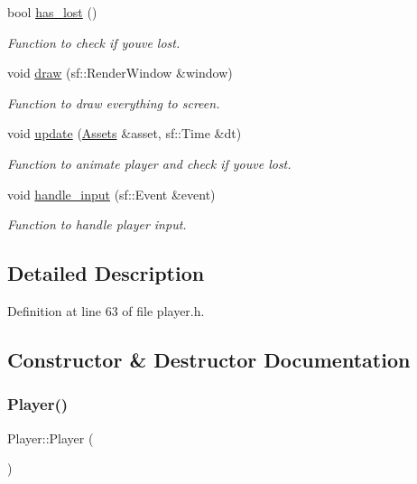 \begin{DoxyCompactItemize}
bool \hyperlink{class_player_a734ead9fd1aa89c2574310425da18dc7}{has\+\_\+lost} ()
\begin{DoxyCompactList}\small\item\em Function to check if you\textquotesingle{}ve lost. \end{DoxyCompactList}\item 
void \hyperlink{class_player_a70bbe0afb8ef88207288c9134ae80b6e}{draw} (sf\+::\+Render\+Window \&window)
\begin{DoxyCompactList}\small\item\em Function to draw everything to screen. \end{DoxyCompactList}\item 
void \hyperlink{class_player_a83282cabf0d698e16fe452759c50712c}{update} (\hyperlink{class_assets}{Assets} \&asset, sf\+::\+Time \&dt)
\begin{DoxyCompactList}\small\item\em Function to animate player and check if you\textquotesingle{}ve lost. \end{DoxyCompactList}\item 
void \hyperlink{class_player_a2a56f0d2037a44c56934c4faac06f54d}{handle\+\_\+input} (sf\+::\+Event \&event)
\begin{DoxyCompactList}\small\item\em Function to handle player input. \end{DoxyCompactList}\end{DoxyCompactItemize}


\subsection{Detailed Description}


Definition at line 63 of file player.\+h.



\subsection{Constructor \& Destructor Documentation}
\mbox{\label{class_player_affe0cc3cb714f6deb4e62f0c0d3f1fd8}} 
\subsubsection{\texorpdfstring{Player()}{Player()}}
{\footnotesize\ttfamily Player\+::\+Player (\begin{DoxyParamCaption}{ }\end{DoxyParamCaption})}



